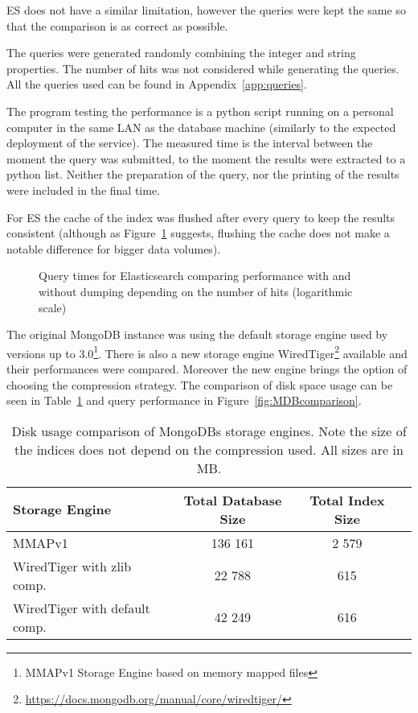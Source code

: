 ES does not have a similar limitation, however the queries were kept
the same so that the comparison is as correct as possible.

The queries were generated randomly combining the integer and string properties. The number of hits was not 
considered while generating the queries. All the queries used can be found in Appendix~\ref{app:queries}.

The program testing the performance is a python script running on a personal computer in the same LAN as the 
database machine (similarly to the expected deployment of the service). The measured time is the interval between 
the moment the query was submitted, to the moment the results were extracted to a python list. Neither the 
preparation of the query, nor the printing of the results were included in the final time. 

For ES the cache of the index was flushed after every query to keep the results consistent (although as 
Figure~\ref{fig:EScache} suggests, flushing the cache does not make a notable difference for bigger data volumes). 

\begin{figure}[h]
	\centering
	
	\caption{Query times for Elasticsearch comparing performance with and without dumping depending on the number of 
	hits (logarithmic scale)}
	\label{fig:EScache}
\end{figure}
\pagebreak
The original MongoDB instance was using the default storage engine used by versions up to 3.0\footnote{MMAPv1 
Storage Engine based on memory mapped files}. There is also a new storage engine WiredTiger\footnote{
\url{https://docs.mongodb.org/manual/core/wiredtiger/}} available and their performances were compared.
Moreover the new engine brings the option of choosing the compression strategy. The comparison of disk space usage 
can be seen in Table~\ref{tab:MongoComp} and query performance in Figure~\ref{fig:MDBcomparison}.

\begin{table}[t]
\centering
\begin{tabular}{lccc}
\toprule
\textbf{Storage Engine}       & \textbf{Total Database Size} & \textbf{Total Index Size} \\ 
\midrule
MMAPv1                        & 136 161                      & 2 579 \\ 
WiredTiger with zlib comp.    & 22 788                       & 615   \\ 
WiredTiger with default comp. & 42 249                       & 616   \\ 
\toprule
\end{tabular}
\caption{Disk usage comparison of MongoDBs storage engines. Note the size of the indices does not depend on the
compression used. All sizes are in MB.}
\label{tab:MongoComp}
\end{table}

